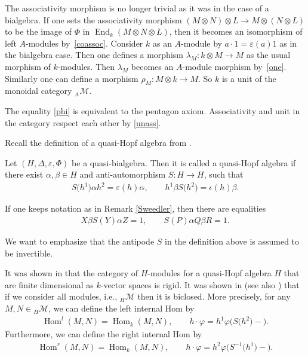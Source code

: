 \documentclass[pdftex]{sigma}
\newcommand{\hmod}{{_H\mathcal{M}}}
\numberwithin{equation}{section}
\begin{document}
The associativity morphism is no longer trivial as it was in the case of a bialgebra. If one sets the associativity morphism $(M \otimes N)\otimes L \rightarrow M \otimes (N\otimes L)$ to be the image of $\Phi$ in $\operatorname{End}_k(M \otimes N \otimes L)$, then it becomes an isomorphism of left $A$-modules by~\eqref{coassoc}. Consider $k$ as an $A$-module by $a \cdot 1 = \varepsilon(a) 1 $ as in the bialgebra case. Then one defines a morphism $\lambda_M\colon k \otimes M \rightarrow M $ as the usual morphism of $k$-modules. Then $\lambda_M$ becomes an $A$-module morphism by~\eqref{one}. Similarly one can define a morphism $\rho_M\colon M\otimes k \rightarrow M $. So $k$ is a unit of the monoidal category $_A\mathcal{M}$.

\begin{Remark}The equality \eqref{phi} is equivalent to the pentagon axiom. Associativity and unit in the category respect each other by \eqref{unass}.
 \end{Remark}

Recall the definition of a quasi-Hopf algebra from \cite{Drinfeld}.

\begin{Definition} Let $(H, \Delta, \varepsilon, \Phi)$ be a quasi-bialgebra. Then it is called a quasi-Hopf algebra if there exist $\alpha, \beta \in H $ and anti-automorphism $S\colon H \rightarrow H$, such that
 \begin{gather*}
 S\big(h^1\big)\alpha h^2 = \varepsilon(h) \alpha, \qquad h^1 \beta S\big(h^2\big) = \epsilon(h) \beta .
 \end{gather*}

If one keeps notation as in Remark \ref{Sweedler}, then there are equalities
 \begin{gather*}
 X \beta S(Y) \alpha Z = 1, \qquad S(P) \alpha Q \beta R = 1.
 \end{gather*}
\end{Definition}

\begin{Remark}	We want to emphasize that the antipode $S$ in the definition above is assumed to be invertible.
\end{Remark}

It was shown in \cite{Drinfeld} that the category of $H$-modules for a quasi-Hopf algebra $H$ that are finite dimensional as $k$-vector spaces is rigid. It was shown in \cite{sk} (see also \cite{BPO_closed, majid_closed, SS_closed}) that if we consider all modules, i.e., $\hmod$ then it is biclosed. More precisely, for any $M, N\in \hmod$, we can define the left internal Hom by
\begin{gather*} %
 \operatorname{Hom}^l(M, N)=\operatorname{Hom}_k(M, N),\qquad h\cdot \varphi = h^1\varphi\big(S\big(h^2\big){-}\big).
\end{gather*} Furthermore, we can define the right internal Hom by
\begin{gather} \label{righthom}
 \operatorname{Hom}^r(M, N)=\operatorname{Hom}_k(M, N),\qquad h\cdot \varphi = h^2\varphi\big(S^{-1}\big(h^1\big){-}\big).
\end{gather}
\end{document}
